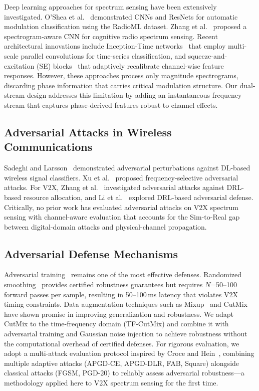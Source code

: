 \documentclass[conference]{IEEEtran}
\begin{document}
Deep learning approaches for spectrum sensing have been extensively investigated. O'Shea et al.~\cite{oshea2018over} demonstrated CNNs and ResNets for automatic modulation classification using the RadioML dataset. Zhang et al.~\cite{zhang2022spectrogram} proposed a spectrogram-aware CNN for cognitive radio spectrum sensing. Recent architectural innovations include Inception-Time networks~\cite{fawaz2020inceptiontime} that employ multi-scale parallel convolutions for time-series classification, and squeeze-and-excitation (SE) blocks~\cite{hu2018squeeze} that adaptively recalibrate channel-wise feature responses. However, these approaches process only magnitude spectrograms, discarding phase information that carries critical modulation structure. Our dual-stream design addresses this limitation by adding an instantaneous frequency stream that captures phase-derived features robust to channel effects.

\subsection{Adversarial Attacks in Wireless Communications}

Sadeghi and Larsson~\cite{sadeghi2019adversarial} demonstrated adversarial perturbations against DL-based wireless signal classifiers. Xu et al.~\cite{xu2024frequency} proposed frequency-selective adversarial attacks. For V2X, Zhang et al.~\cite{zhang2025efficient} investigated adversarial attacks against DRL-based resource allocation, and Li et al.~\cite{li2024drl} explored DRL-based adversarial defense. Critically, no prior work has evaluated adversarial attacks on V2X spectrum sensing with channel-aware evaluation that accounts for the Sim-to-Real gap between digital-domain attacks and physical-channel propagation.

\subsection{Adversarial Defense Mechanisms}

Adversarial training~\cite{madry2019towards} remains one of the most effective defenses. Randomized smoothing~\cite{cohen2019certified} provides certified robustness guarantees but requires $N$=50--100 forward passes per sample, resulting in 50--100\,ms latency that violates V2X timing constraints. Data augmentation techniques such as Mixup~\cite{zhang2018mixup} and CutMix~\cite{yun2019cutmix} have shown promise in improving generalization and robustness. We adapt CutMix to the time-frequency domain (TF-CutMix) and combine it with adversarial training and Gaussian noise injection to achieve robustness without the computational overhead of certified defenses. For rigorous evaluation, we adopt a multi-attack evaluation protocol inspired by Croce and Hein~\cite{croce2020reliable}, combining multiple adaptive attacks (APGD-CE, APGD-DLR, FAB, Square) alongside classical attacks (FGSM, PGD-20) to reliably assess adversarial robustness---a methodology applied here to V2X spectrum sensing for the first time.
\end{document}
